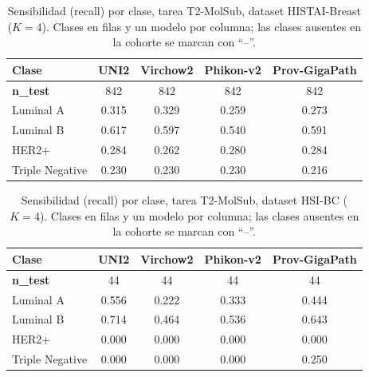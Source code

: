 \begin{table}[H]
\centering
\caption{Sensibilidad (recall) por clase, tarea T2-MolSub, dataset HISTAI-Breast ($K=4$). Clases en filas y un modelo por columna; las clases ausentes en la cohorte se marcan con ``--''.}
\label{tab:anexo_molsub_sensibilidad_histai}
\begin{tabular}{l c c c c}
\toprule
\textbf{Clase} & \textbf{UNI2} & \textbf{Virchow2} & \textbf{Phikon-v2} & \textbf{Prov-GigaPath} \\
\midrule
\textbf{n\_test} & 842 & 842 & 842 & 842 \\
Luminal A & 0.315 & 0.329 & 0.259 & 0.273 \\
Luminal B & 0.617 & 0.597 & 0.540 & 0.591 \\
HER2+ & 0.284 & 0.262 & 0.280 & 0.284 \\
Triple Negative & 0.230 & 0.230 & 0.230 & 0.216 \\
\bottomrule
\end{tabular}
\end{table}

\begin{table}[H]
\centering
\caption{Sensibilidad (recall) por clase, tarea T2-MolSub, dataset HSI-BC ($K=4$). Clases en filas y un modelo por columna; las clases ausentes en la cohorte se marcan con ``--''.}
\label{tab:anexo_molsub_sensibilidad_hsibc}
\begin{tabular}{l c c c c}
\toprule
\textbf{Clase} & \textbf{UNI2} & \textbf{Virchow2} & \textbf{Phikon-v2} & \textbf{Prov-GigaPath} \\
\midrule
\textbf{n\_test} & 44 & 44 & 44 & 44 \\
Luminal A & 0.556 & 0.222 & 0.333 & 0.444 \\
Luminal B & 0.714 & 0.464 & 0.536 & 0.643 \\
HER2+ & 0.000 & 0.000 & 0.000 & 0.000 \\
Triple Negative & 0.000 & 0.000 & 0.000 & 0.250 \\
\bottomrule
\end{tabular}
\end{table}

